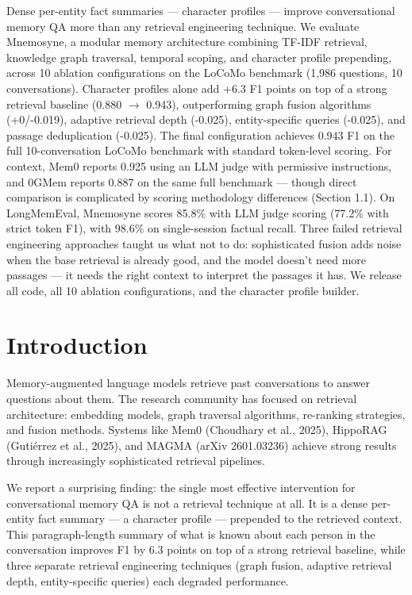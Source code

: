 \documentclass[11pt]{article}
\begin{document}
Dense per-entity fact summaries --- character profiles --- improve conversational memory QA more than any retrieval engineering technique. We evaluate Mnemosyne, a modular memory architecture combining TF-IDF retrieval, knowledge graph traversal, temporal scoping, and character profile prepending, across 10 ablation configurations on the LoCoMo benchmark (1,986 questions, 10 conversations). Character profiles alone add +6.3 F1 points on top of a strong retrieval baseline (0.880 $\rightarrow$ 0.943), outperforming graph fusion algorithms (+0/-0.019), adaptive retrieval depth (-0.025), entity-specific queries (-0.025), and passage deduplication (-0.025). The final configuration achieves 0.943 F1 on the full 10-conversation LoCoMo benchmark with standard token-level scoring. For context, Mem0 reports 0.925 using an LLM judge with permissive instructions, and 0GMem reports 0.887 on the same full benchmark --- though direct comparison is complicated by scoring methodology differences (Section 1.1). On LongMemEval, Mnemosyne scores 85.8\% with LLM judge scoring (77.2\% with strict token F1), with 98.6\% on single-session factual recall. Three failed retrieval engineering approaches taught us what not to do: sophisticated fusion adds noise when the base retrieval is already good, and the model doesn't need more passages --- it needs the right context to interpret the passages it has. We release all code, all 10 ablation configurations, and the character profile builder.



\section{Introduction}

Memory-augmented language models retrieve past conversations to answer questions about them. The research community has focused on retrieval architecture: embedding models, graph traversal algorithms, re-ranking strategies, and fusion methods. Systems like Mem0 (Choudhary et al., 2025), HippoRAG (Gutiérrez et al., 2025), and MAGMA (arXiv 2601.03236) achieve strong results through increasingly sophisticated retrieval pipelines.

We report a surprising finding: the single most effective intervention for conversational memory QA is not a retrieval technique at all. It is a dense per-entity fact summary --- a character profile --- prepended to the retrieved context. This paragraph-length summary of what is known about each person in the conversation improves F1 by 6.3 points on top of a strong retrieval baseline, while three separate retrieval engineering techniques (graph fusion, adaptive retrieval depth, entity-specific queries) each degraded performance.
\end{document}
